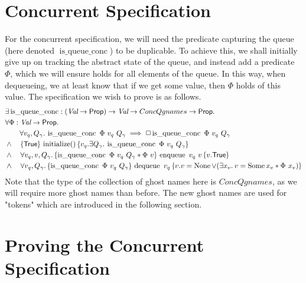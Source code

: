 \documentclass[twoside,11pt,openright]{report}
\newcommand{\initialise}{\operatorname{initialize}}
\newcommand{\enqueue}{\operatorname{enqueue}}
\newcommand{\dequeue}{\operatorname{dequeue}}
\newcommand{\isqueueconc}{\operatorname{is\_queue\_conc}}
\begin{document}
\section{Concurrent Specification}
For the concurrent specification, we will need the predicate capturing the queue (here denoted $\isqueueconc$) to be duplicable. To achieve this, we shall initially give up on tracking the abstract state of the queue, and instead add a predicate $\Phi$, which we will ensure holds for all elements of the queue. In this way, when dequeueing, we at least know that if we get some value, then $\Phi$ holds of this value. The specification we wish to prove is as follows.
\begin{align*}
  &\Exists \isqueueconc : (\Val \to \Prop) \to \Val \to ConcQgnames \to \Prop.\\
  &\All \Phi : \Val \to \Prop.\\
  &\quad\quad \All v_q, Q_\gname . \isqueueconc \ \Phi \ v_q \ Q_\gname \implies \persistently \isqueueconc \ \Phi \ v_q \ Q_\gname\\
  &\land\quad\hoare{\TRUE}{\initialise \TT}{v_q . \Exists Q_\gname. \isqueueconc\ \Phi \ v_q \ Q_\gname}\\
  &\land\quad\All v_q, v, Q_\gname. \hoare{\isqueueconc \ \Phi \ v_q \ Q_\gname \ast \Phi \ v}{\enqueue\ v_q\ v}{v . \TRUE}\\
  &\land\quad\All v_q, Q_\gname. \hoare{\isqueueconc \ \Phi \ v_q \ Q_\gname}{\dequeue\ v_q}{v . v = \None \lor (\Exists x_v. v = \Some x_v \ast \Phi \ x_v)}
\end{align*}
Note that the type of the collection of ghost names here is $ConcQgnames$, as we will require more ghost names than before. The new ghost names are used for "tokens" which are introduced in the following section.

\section{Proving the Concurrent Specification}
\end{document}
